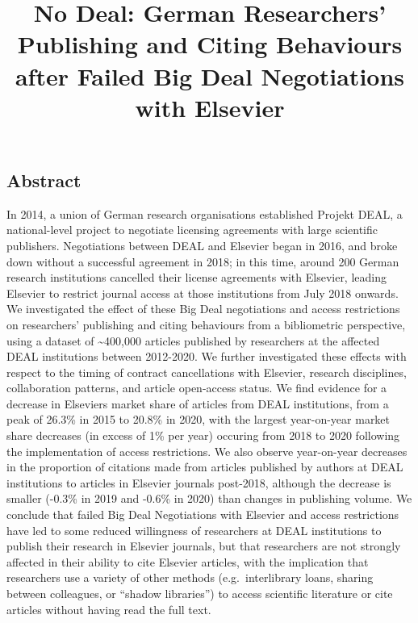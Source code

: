 \documentclass[
]{article}
\title{No Deal: German Researchers' Publishing and Citing Behaviours after Failed Big Deal Negotiations with Elsevier}
\author{}
\date{\vspace{-2.5em}}
\begin{document}
\maketitle

\hypertarget{abstract}{%
\subsection{Abstract}\label{abstract}}

In 2014, a union of German research organisations established Projekt DEAL, a national-level project to negotiate licensing agreements with large scientific publishers. Negotiations between DEAL and Elsevier began in 2016, and broke down without a successful agreement in 2018; in this time, around 200 German research institutions cancelled their license agreements with Elsevier, leading Elsevier to restrict journal access at those institutions from July 2018 onwards. We investigated the effect of these Big Deal negotiations and access restrictions on researchers' publishing and citing behaviours from a bibliometric perspective, using a dataset of \textasciitilde400,000 articles published by researchers at the affected DEAL institutions between 2012-2020. We further investigated these effects with respect to the timing of contract cancellations with Elsevier, research disciplines, collaboration patterns, and article open-access status. We find evidence for a decrease in Elsevier\textquotesingle s market share of articles from DEAL institutions, from a peak of 26.3\% in 2015 to 20.8\% in 2020, with the largest year-on-year market share decreases (in excess of 1\% per year) occuring from 2018 to 2020 following the implementation of access restrictions. We also observe year-on-year decreases in the proportion of citations made from articles published by authors at DEAL institutions to articles in Elsevier journals post-2018, although the decrease is smaller (-0.3\% in 2019 and -0.6\% in 2020) than changes in publishing volume. We conclude that failed Big Deal Negotiations with Elsevier and access restrictions have led to some reduced willingness of researchers at DEAL institutions to publish their research in Elsevier journals, but that researchers are not strongly affected in their ability to cite Elsevier articles, with the implication that researchers use a variety of other methods (e.g.~interlibrary loans, sharing between colleagues, or ``shadow libraries'') to access scientific literature or cite articles without having read the full text.
\end{document}
